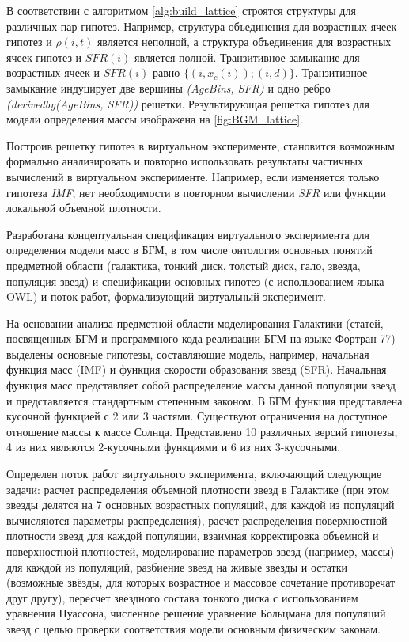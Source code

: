 В соответствии с алгоритмом \ref{alg:build_lattice} строятся структуры для различных пар гипотез. Например, структура 
объединения для возрастных ячеек гипотез и $\rho(i, t)$ является неполной, а структура объединения для возрастных 
ячеек гипотез и $SFR(i)$ является полной. Транзитивное замыкание для возрастных ячеек и $SFR(i)$ 
равно $\{(i, x_c(i)); (i, d)\}$. Транзитивное замыкание индуцирует две вершины \textit{(AgeBins, SFR)} 
и одно ребро \textit{(derived\textunderscore by(AgeBins, SFR))} решетки. Результирующая решетка гипотез 
для модели определения массы изображена на \cref{fig:BGM_lattice}.

Построив решетку гипотез в виртуальном эксперименте, становится возможным формально анализировать и повторно 
использовать результаты частичных вычислений в виртуальном эксперименте. Например, если изменяется только 
гипотеза \textit{IMF}, нет необходимости в повторном вычислении \textit{SFR} или функции локальной объемной плотности.

Разработана концептуальная спецификация виртуального эксперимента для определения модели масс в БГМ, в том 
числе онтология основных понятий предметной области (галактика, тонкий диск, толстый диск, гало, звезда, 
популяция звезд) и спецификации основных гипотез (с использованием языка OWL) и поток работ, формализующий 
виртуальный эксперимент.

На основании анализа предметной области моделирования Галактики (статей, посвященных БГМ и программного 
кода реализации БГМ на языке Фортран 77) выделены основные гипотезы, составляющие модель, например, 
начальная функция масс (IMF) и функция скорости образования звезд (SFR). Начальная функция масс представляет 
собой распределение массы данной популяции звезд и представляется стандартным степенным законом. 
В БГМ функция представлена кусочной функцией с 2 или 3 частями. Существуют ограничения на доступное 
отношение массы к массе Солнца. Представлено 10 различных версий гипотезы, 4 из них являются 2-кусочными 
функциями и 6 из них 3-кусочными.

Определен поток работ виртуального эксперимента, включающий следующие задачи: расчет распределения объемной 
плотности звезд в Галактике (при этом звезды делятся на 7 основных возрастных популяций, для каждой из 
популяций вычисляются параметры распределения), расчет распределения поверхностной плотности звезд для каждой 
популяции, взаимная корректировка объемной и поверхностной плотностей, моделирование параметров звезд 
(например, массы) для каждой из популяций, разбиение звезд на живые звезды и остатки (возможные звёзды, для 
которых возрастное и массовое сочетание противоречат друг другу), пересчет звездного состава тонкого диска с 
использованием уравнения Пуассона, численное решение уравнение Больцмана для популяций звезд с целью проверки 
соответствия модели основным физическим законам.

